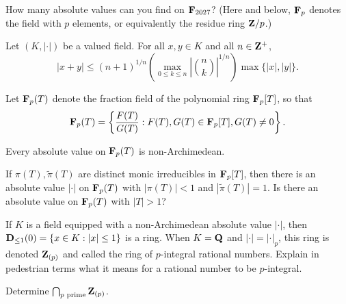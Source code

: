 \absval
    
\begin{prob}\label{prob:16} How many absolute values can you find on $\mathbf{F}_{2027}$? (Here and below, $\mathbf{F}_p$ denotes the field with $p$ elements, or equivalently the residue ring $\mathbf{Z}/p$.)
\end{prob}

\begin{prob}\label{prob:17} Let $(K,|\cdot|)$ be a valued field. For all $x, y \in K$ and all $n\in \mathbf{Z}^{+}$,
\[ |x+y| \le (n+1)^{1/n}\left(\max_{0\le k \le n} \left|\binom{n}{k}\right|^{1/n}\right)\max\{|x|,|y|\}. \]
\end{prob}


Let $\mathbf{F}_p(T)$ denote the fraction field of the polynomial ring $\mathbf{F}_p[T]$, so that
\[ \mathbf{F}_p(T) = \left\{\frac{F(T)}{G(T)}: F(T), G(T) \in \mathbf{F}_p[T], G(T) \ne 0\right\}. \] 


\begin{prob}\label{prob:18} Every absolute value on $\mathbf{F}_p(T)$ is non-Archimedean.
\end{prob}


\begin{prob}\label{prob:19} If $\pi(T), \tilde{\pi}(T)$ are distinct monic irreducibles in $\mathbf{F}_p[T]$, then there is an absolute value $|\cdot|$ on $\mathbf{F}_p(T)$ with $|\pi(T)| < 1$ and $|\tilde{\pi}(T)|=1$. Is there an absolute value on $\mathbf{F}_p(T)$ with $|T| > 1$?
\end{prob}



\begin{prob}\label{prob:earlyO}\label{prob:20} If $K$ is a field equipped with a non-Archimedean absolute value $|\cdot|$, then $\mathbf{D}_{\le 1}(0)= \{x \in K: |x|\le 1\}$ is a ring. When $K=\mathbf{Q}$ and $|\cdot| = |\cdot|_p$, this ring is denoted $\mathbf{Z}_{(p)}$ and called the ring of \textsf{$p$-integral} rational numbers. Explain in pedestrian terms what it means for a rational number to be $p$-integral.\end{prob}

\begin{prob}\label{prob:21} Determine $\bigcap_{p\text{ prime}} \mathbf{Z}_{(p)}$.
\end{prob}


\psh



